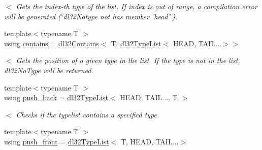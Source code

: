 \begin{DoxyCompactItemize}
\begin{DoxyCompactList}\small\item\em $<$ Gets the index-\/th type of the list. If index is out of range, a compilation error will be generated (\char`\"{}dl32\-Notype not has member 'head'\char`\"{}). \end{DoxyCompactList}\item 
\hypertarget{structdl32_type_list_3_01_h_e_a_d_00_01_t_a_i_l_8_8_8_4_a734356b04c182da95863402b1f646f20}{{\footnotesize template$<$typename T $>$ }\\using \hyperlink{structdl32_type_list_3_01_h_e_a_d_00_01_t_a_i_l_8_8_8_4_a734356b04c182da95863402b1f646f20}{contains} = \hyperlink{structdl32_contains}{dl32\-Contains}$<$ T, \hyperlink{structdl32_type_list}{dl32\-Type\-List}$<$ H\-E\-A\-D, T\-A\-I\-L...$>$$>$}\label{structdl32_type_list_3_01_h_e_a_d_00_01_t_a_i_l_8_8_8_4_a734356b04c182da95863402b1f646f20}

\begin{DoxyCompactList}\small\item\em $<$ Gets the position of a given type in the list. If the type is not in the list, \hyperlink{classdl32_no_type}{dl32\-No\-Type} will be returned. \end{DoxyCompactList}\item 
\hypertarget{structdl32_type_list_3_01_h_e_a_d_00_01_t_a_i_l_8_8_8_4_a196a19360c7e87c85a868cb731ac6fa6}{{\footnotesize template$<$typename T $>$ }\\using \hyperlink{structdl32_type_list_3_01_h_e_a_d_00_01_t_a_i_l_8_8_8_4_a196a19360c7e87c85a868cb731ac6fa6}{push\-\_\-back} = \hyperlink{structdl32_type_list}{dl32\-Type\-List}$<$ H\-E\-A\-D, T\-A\-I\-L..., T $>$}\label{structdl32_type_list_3_01_h_e_a_d_00_01_t_a_i_l_8_8_8_4_a196a19360c7e87c85a868cb731ac6fa6}

\begin{DoxyCompactList}\small\item\em $<$ Checks if the typelist contains a specified type. \end{DoxyCompactList}\item 
\hypertarget{structdl32_type_list_3_01_h_e_a_d_00_01_t_a_i_l_8_8_8_4_aa06db183b95a529eb046ad426eac9b18}{{\footnotesize template$<$typename T $>$ }\\using \hyperlink{structdl32_type_list_3_01_h_e_a_d_00_01_t_a_i_l_8_8_8_4_aa06db183b95a529eb046ad426eac9b18}{push\-\_\-front} = \hyperlink{structdl32_type_list}{dl32\-Type\-List}$<$ T, H\-E\-A\-D, T\-A\-I\-L...$>$}\label{structdl32_type_list_3_01_h_e_a_d_00_01_t_a_i_l_8_8_8_4_aa06db183b95a529eb046ad426eac9b18}


\end{DoxyCompactItemize}
